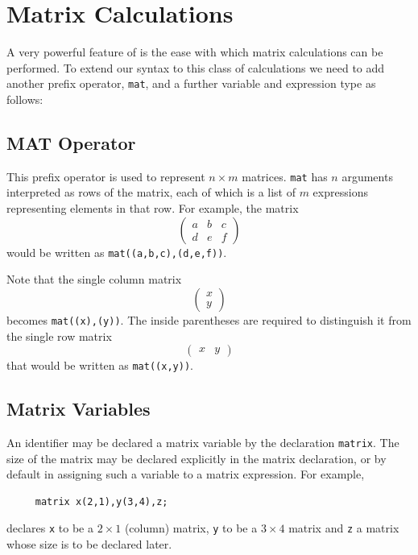 \chapter{Matrix Calculations} 
A very powerful feature of {\REDUCE} is the ease with which matrix
calculations can be performed. To extend our syntax to this class of
calculations we need to add another prefix operator, \texttt{mat},
and a further variable and expression type as follows:

\section{MAT Operator}
\hypertarget{operator:MAT}{}
This prefix operator is used to represent $n\times m$ matrices. \texttt{mat}
has $n$ arguments interpreted as rows of the matrix, each of
which is a list of $m$ expressions representing elements in that row.
For example, the matrix
\[ \left( \begin{array}{lcr} a & b & c \\ d & e & f \end{array} \right) \]
would be written as \texttt{mat((a,b,c),(d,e,f))}.

Note that the single column matrix
\[ \left( \begin{array}{c} x \\ y \end{array} \right) \]
becomes \texttt{mat((x),(y))}.  The inside parentheses are required to
distinguish it from the single row matrix
\[ \left( \begin{array}{lr} x & y \end{array} \right) \]
that would be written as \texttt{mat((x,y))}.

\section{Matrix Variables}
\label{sec:core-matrix-variables}
\hypertarget{command:MATRIX}{}

An identifier may be declared a matrix variable by the declaration
\texttt{matrix}.
The size of the matrix may be declared explicitly in the matrix
declaration, or by default in assigning such a variable to a matrix
expression. For example,
\begin{verbatim}
     matrix x(2,1),y(3,4),z;
\end{verbatim}
declares \texttt{x} to be a $2 \times 1$ (column) matrix, \texttt{y}
to be a $3 \times 4$ matrix and \texttt{z} a matrix whose size is to
be declared later.

